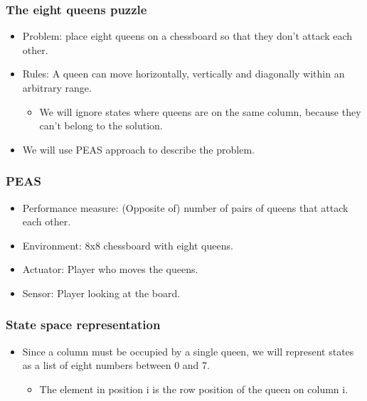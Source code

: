 \documentclass{beamer}
\begin{document}
    \begin{frame}
    \frametitle{The eight queens puzzle}
    \begin{itemize}
        \item Problem: place eight queens on a chessboard so that they don't attack each other.
        \pause
        \item Rules: A queen can move horizontally, vertically and diagonally within an arbitrary range.
        \pause
            \begin{itemize}
                \item We will ignore states where queens are on the same column, because they can't belong to the solution.
            \end{itemize}
        \pause
        \item We will use PEAS approach to describe the problem.
    \end{itemize}
    \end{frame}

    \begin{frame}
    \frametitle{PEAS}
        \begin{itemize}
            \item Performance measure: (Opposite of) number of pairs of queens that attack each other.
            \pause
            \item Environment: 8x8 chessboard with eight queens. 
            \pause
            \item Actuator: Player who moves the queens.
            \pause
            \item Sensor: Player looking at the board.
        \end{itemize}
    \end{frame}

    \begin{frame}
    \frametitle{State space representation}
        \begin{itemize}
            \item Since a column must be occupied by a single queen, we will represent states as a list of eight numbers between 0 and 7.
            \pause
            \begin{itemize}
                \item The element in position i is the row position of the queen on column i.
            \end{itemize}
        \end{itemize}
    \end{frame}
\end{document}
